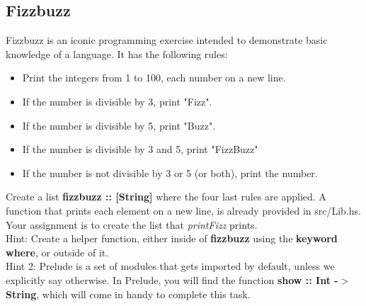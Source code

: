 \documentclass{article}
\begin{document}
\subsection{Fizzbuzz}
Fizzbuzz is an iconic programming exercise intended to demonstrate basic knowledge of a language. It has the following rules:
\begin{itemize}
    \item Print the integers from 1 to 100, each number on a new line.
    \item If the number is divisible by 3, print "Fizz".
    \item If the number is divisible by 5, print "Buzz".
    \item If the number is divisible by 3 and 5, print "FizzBuzz"
    \item If the number is not divisible by 3 or 5 (or both), print the number.
\end{itemize}
Create a list \textbf{fizzbuzz :: [String]} where the four last rules are applied. A function that prints each element on a new line, is already provided in src/Lib.hs. Your assignment is to create the list that \textit{printFizz} prints.\\
Hint: Create a helper function, either inside of \textbf{fizzbuzz} using the \textbf{keyword where}, or outside of it.\\
Hint 2: Prelude is a set of modules that gets imported by default, unless we explicitly say otherwise. In Prelude, you will find the function \textbf{show :: Int -$>$ String}, which will come in handy to complete this task.
\end{document}
